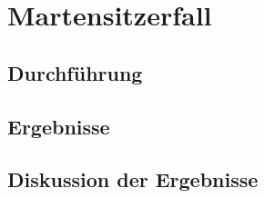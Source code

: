 \chapter{Martensitzerfall}

\section{Durchführung}
\section{Ergebnisse}
\section{Diskussion der Ergebnisse}